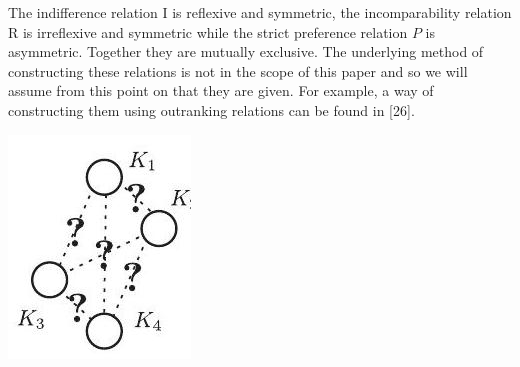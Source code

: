 \documentclass[10pt]{article}
\begin{document}
The indifference relation I is reflexive and symmetric, the incomparability relation $\mathrm{R}$ is irreflexive and symmetric while the strict preference relation $P$ is asymmetric. Together they are mutually exclusive. The underlying method of constructing these relations is not in the scope of this paper and so we will assume from this point on that they are given. For example, a way of constructing them using outranking relations can be found in [26].

\begin{center}
\includegraphics[max width=\textwidth]{2024_01_11_fda3c6ffd32dd805faacg-3(1)}
\end{center}
\end{document}
